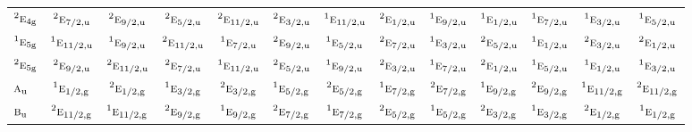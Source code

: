 \documentclass[10pt,a4paper]{article}
\numberwithin{equation}{section}
\newcommand{\irr}[1]{\text{\normalfont\scshape #1}}
\newcommand{\conjpair}[1]{{}^{#1}}
\newcommand{\ptag}[1]{\mathrm{#1}}
\begin{document}
{\begin{longtable}{@{}lcccccccccccc@{}}
$\conjpair{2}\irr{e}_{4\ptag{g}}$ & $\conjpair{2}\irr{e}_{7/2,\ptag{u}}$ & $\conjpair{2}\irr{e}_{9/2,\ptag{u}}$ & $\conjpair{2}\irr{e}_{5/2,\ptag{u}}$ & $\conjpair{2}\irr{e}_{11/2,\ptag{u}}$ & $\conjpair{2}\irr{e}_{3/2,\ptag{u}}$ & $\conjpair{1}\irr{e}_{11/2,\ptag{u}}$ & $\conjpair{2}\irr{e}_{1/2,\ptag{u}}$ & $\conjpair{1}\irr{e}_{9/2,\ptag{u}}$ & $\conjpair{1}\irr{e}_{1/2,\ptag{u}}$ & $\conjpair{1}\irr{e}_{7/2,\ptag{u}}$ & $\conjpair{1}\irr{e}_{3/2,\ptag{u}}$ & $\conjpair{1}\irr{e}_{5/2,\ptag{u}}$\\
$\conjpair{1}\irr{e}_{5\ptag{g}}$ & $\conjpair{1}\irr{e}_{11/2,\ptag{u}}$ & $\conjpair{1}\irr{e}_{9/2,\ptag{u}}$ & $\conjpair{2}\irr{e}_{11/2,\ptag{u}}$ & $\conjpair{1}\irr{e}_{7/2,\ptag{u}}$ & $\conjpair{2}\irr{e}_{9/2,\ptag{u}}$ & $\conjpair{1}\irr{e}_{5/2,\ptag{u}}$ & $\conjpair{2}\irr{e}_{7/2,\ptag{u}}$ & $\conjpair{1}\irr{e}_{3/2,\ptag{u}}$ & $\conjpair{2}\irr{e}_{5/2,\ptag{u}}$ & $\conjpair{1}\irr{e}_{1/2,\ptag{u}}$ & $\conjpair{2}\irr{e}_{3/2,\ptag{u}}$ & $\conjpair{2}\irr{e}_{1/2,\ptag{u}}$\\
$\conjpair{2}\irr{e}_{5\ptag{g}}$ & $\conjpair{2}\irr{e}_{9/2,\ptag{u}}$ & $\conjpair{2}\irr{e}_{11/2,\ptag{u}}$ & $\conjpair{2}\irr{e}_{7/2,\ptag{u}}$ & $\conjpair{1}\irr{e}_{11/2,\ptag{u}}$ & $\conjpair{2}\irr{e}_{5/2,\ptag{u}}$ & $\conjpair{1}\irr{e}_{9/2,\ptag{u}}$ & $\conjpair{2}\irr{e}_{3/2,\ptag{u}}$ & $\conjpair{1}\irr{e}_{7/2,\ptag{u}}$ & $\conjpair{2}\irr{e}_{1/2,\ptag{u}}$ & $\conjpair{1}\irr{e}_{5/2,\ptag{u}}$ & $\conjpair{1}\irr{e}_{1/2,\ptag{u}}$ & $\conjpair{1}\irr{e}_{3/2,\ptag{u}}$\\
$\irr{a}_{\ptag{u}}$ & $\conjpair{1}\irr{e}_{1/2,\ptag{g}}$ & $\conjpair{2}\irr{e}_{1/2,\ptag{g}}$ & $\conjpair{1}\irr{e}_{3/2,\ptag{g}}$ & $\conjpair{2}\irr{e}_{3/2,\ptag{g}}$ & $\conjpair{1}\irr{e}_{5/2,\ptag{g}}$ & $\conjpair{2}\irr{e}_{5/2,\ptag{g}}$ & $\conjpair{1}\irr{e}_{7/2,\ptag{g}}$ & $\conjpair{2}\irr{e}_{7/2,\ptag{g}}$ & $\conjpair{1}\irr{e}_{9/2,\ptag{g}}$ & $\conjpair{2}\irr{e}_{9/2,\ptag{g}}$ & $\conjpair{1}\irr{e}_{11/2,\ptag{g}}$ & $\conjpair{2}\irr{e}_{11/2,\ptag{g}}$\\
$\irr{b}_{\ptag{u}}$ & $\conjpair{2}\irr{e}_{11/2,\ptag{g}}$ & $\conjpair{1}\irr{e}_{11/2,\ptag{g}}$ & $\conjpair{2}\irr{e}_{9/2,\ptag{g}}$ & $\conjpair{1}\irr{e}_{9/2,\ptag{g}}$ & $\conjpair{2}\irr{e}_{7/2,\ptag{g}}$ & $\conjpair{1}\irr{e}_{7/2,\ptag{g}}$ & $\conjpair{2}\irr{e}_{5/2,\ptag{g}}$ & $\conjpair{1}\irr{e}_{5/2,\ptag{g}}$ & $\conjpair{2}\irr{e}_{3/2,\ptag{g}}$ & $\conjpair{1}\irr{e}_{3/2,\ptag{g}}$ & $\conjpair{2}\irr{e}_{1/2,\ptag{g}}$ & $\conjpair{1}\irr{e}_{1/2,\ptag{g}}$\\

\end{longtable}}
\end{document}
